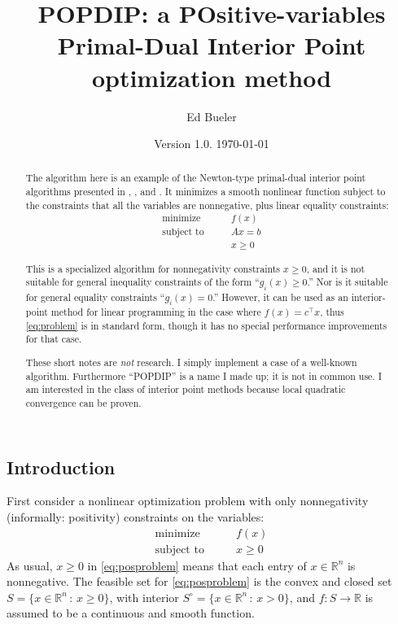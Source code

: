 \documentclass[11pt]{article}
\title{POPDIP: a POsitive-variables \\ Primal-Dual Interior Point optimization method}
\author{Ed Bueler}
\date{Version 1.0. \today}
\newcommand{\RR}{\mathbb{R}}
\begin{document}
\maketitle

\begin{abstract}
The algorithm here is an example of the Newton-type primal-dual interior point algorithms presented in \cite[section 16.7]{GrivaNashSofer2009}, \cite[chapter 19]{NocedalWright2006}, and \cite{YamashitaYabe1996}.  It minimizes a smooth nonlinear function subject to the constraints that all the variables are nonnegative, plus linear equality constraints:
\begin{equation}
\begin{matrix}
\text{minimize} \qquad   & f(x) \\
\text{subject to} \qquad & A x = b \\
                         & x \ge 0
\end{matrix} \label{eq:problem}
\end{equation}

This is a specialized algorithm for nonnegativity constraints $x\ge 0$, and it is not suitable for general inequality constraints of the form ``$g_i(x)\ge 0$.''  Nor is it suitable for general equality constraints ``$g_i(x)=0$.''  However, it can be used as an interior-point method for linear programming in the case where $f(x)=c^\top x$, thus \eqref{eq:problem} is in standard form, though it has no special performance improvements for that case.

These short notes are \emph{not} research.  I simply implement a case of a well-known algorithm.  Furthermore ``POPDIP'' is a name I made up; it is not in common use.  I am interested in the class of interior point methods because local quadratic convergence can be proven.
\end{abstract}

\thispagestyle{empty}

\bigskip
\subsection*{Introduction}

First consider a nonlinear optimization problem with only nonnegativity (informally: positivity) constraints on the variables:
\begin{equation}
\begin{matrix}
\text{minimize} \qquad & f(x) \\
\text{subject to} \qquad & x \ge 0
\end{matrix} \label{eq:posproblem}
\end{equation}
As usual, $x\ge 0$ in \eqref{eq:posproblem} means that each entry of $x\in\RR^n$ is nonnegative.  The feasible set for \eqref{eq:posproblem} is the convex and closed set $S = \{x\in \RR^n\,:\,x\ge 0\}$, with interior $S^\circ = \{x\in \RR^n\,:\,x > 0\}$, and $f:S \to \RR$ is assumed to be a continuous and smooth function.
\end{document}
